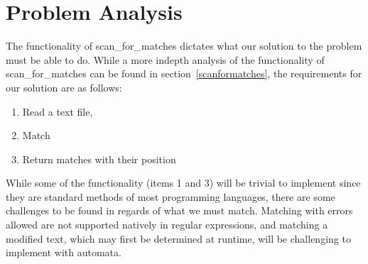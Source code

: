\section{Problem Analysis}

The functionality of scan\_for\_matches dictates what our solution to the 
problem must be able to do. While a more indepth analysis of the functionality 
of scan\_for\_matches can be found in section~\ref{scanformatches}, 
the requirements for our solution are as follows:
\begin{enumerate}
\item Read a text file,
\item Match
\item Return matches with their position
\end{enumerate}
While some of the functionality (items 1 and 3) will be trivial to implement 
since they are standard methods of most programming languages, there are 
some challenges to be found in regards of what we must match. Matching with 
errors allowed are not supported natively in regular expressions, and 
matching a modified text, which may first be determined at runtime, will be 
challenging to implement with automata.
